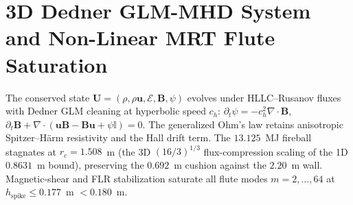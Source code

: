 \section{3D Dedner GLM-MHD System and Non-Linear MRT Flute Saturation}
The conserved state $\mathbf{U} = (\rho, \rho\mathbf{u},
\mathcal{E}, \mathbf{B}, \psi)$ evolves under HLLC--Rusanov fluxes with
Dedner GLM cleaning at hyperbolic speed $c_h$: $\partial_t\psi =
-c_h^2\nabla\cdot\mathbf{B}$, $\partial_t\mathbf{B} +
\nabla\cdot(\mathbf{u}\mathbf{B} - \mathbf{B}\mathbf{u} + \psi
\mathbb{I}) = 0$.  The generalized Ohm's law retains anisotropic
Spitzer--H{\"a}rm resistivity and the Hall drift term.  The $13.125$~MJ
fireball stagnates at $r_c = 1.508$~m (the 3D $(16/3)^{1/3}$
flux-compression scaling of the 1D $0.8631$~m bound), preserving the
$0.692$~m cushion against the $2.20$~m wall.  Magnetic-shear and FLR
stabilization saturate all flute modes $m = 2,\ldots,64$ at
$h_{\text{spike}} \le 0.177$~m $< 0.180$~m.
